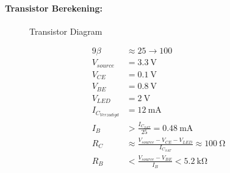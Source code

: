 \paragraph{Transistor Berekening:}
\begin{figure}
	\caption{Transistor Diagram}
	\label{fig:TransistorDiagram}
\end{figure}

\begin{alignat}{9}
\beta &\approx 25\to 100\\
V_{source}&=\SI{3.3}{\volt}\\
V_{CE}&=\SI{0.1}{\volt}\\
V_{BE}&=\SI{0.8}{\volt}\\
V_{LED}&=\SI{2}{\volt}\\
I_{C_{Verzadigd}}&=\SI{12}{\milli\ampere}\\
I_B&>\frac{I_{C_{SAT}}}{25}=\SI{0.48}{\milli\ampere}\\
R_C& \approx \frac{V_{source}-V_{CE}-V_{LED}}{I_{C_{SAT}}} \approx \SI{100}{\ohm}\\
R_B& < \frac{V_{source}-V_{BE}}{I_B}<\SI{5.2}{\kilo\ohm}
\end{alignat}

